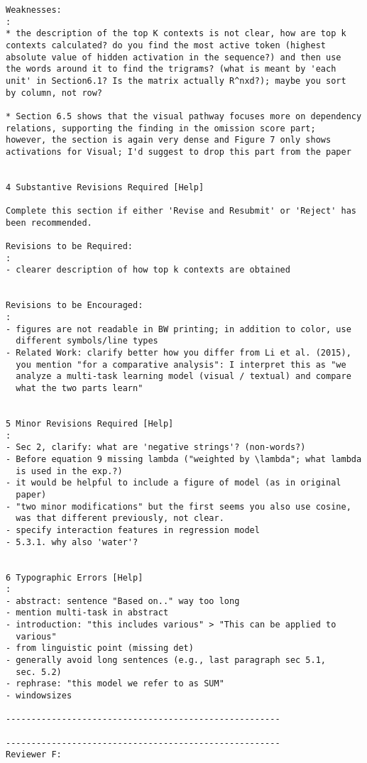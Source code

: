 \begin{verbatim}
Weaknesses:
: 
* the description of the top K contexts is not clear, how are top k
contexts calculated? do you find the most active token (highest
absolute value of hidden activation in the sequence?) and then use
the words around it to find the trigrams? (what is meant by 'each
unit' in Section6.1? Is the matrix actually R^nxd?); maybe you sort
by column, not row? 

* Section 6.5 shows that the visual pathway focuses more on dependency
relations, supporting the finding in the omission score part;
however, the section is again very dense and Figure 7 only shows
activations for Visual; I'd suggest to drop this part from the paper


4 Substantive Revisions Required [Help]

Complete this section if either 'Revise and Resubmit' or 'Reject' has
been recommended.

Revisions to be Required:
: 
- clearer description of how top k contexts are obtained


Revisions to be Encouraged:
: 
- figures are not readable in BW printing; in addition to color, use
  different symbols/line types
- Related Work: clarify better how you differ from Li et al. (2015),
  you mention "for a comparative analysis": I interpret this as "we
  analyze a multi-task learning model (visual / textual) and compare
  what the two parts learn"


5 Minor Revisions Required [Help]
: 
- Sec 2, clarify: what are 'negative strings'? (non-words?)
- Before equation 9 missing lambda ("weighted by \lambda"; what lambda
  is used in the exp.?)
- it would be helpful to include a figure of model (as in original
  paper)
- "two minor modifications" but the first seems you also use cosine,
  was that different previously, not clear.
- specify interaction features in regression model
- 5.3.1. why also 'water'?


6 Typographic Errors [Help]
: 
- abstract: sentence "Based on.." way too long
- mention multi-task in abstract
- introduction: "this includes various" > "This can be applied to
  various"
- from linguistic point (missing det)
- generally avoid long sentences (e.g., last paragraph sec 5.1,
  sec. 5.2)
- rephrase: "this model we refer to as SUM"
- windowsizes

------------------------------------------------------

------------------------------------------------------
Reviewer F:



\end{verbatim}
